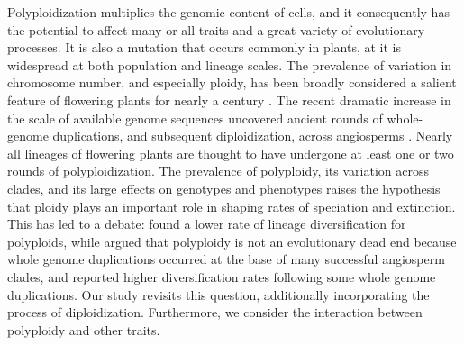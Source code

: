 Polyploidization multiplies the genomic content of cells, and it consequently has the potential to affect many or all traits and a great variety of evolutionary processes.
It is also a mutation that occurs commonly in plants, at it is widespread at both population and lineage scales.
The prevalence of variation in chromosome number, and especially ploidy, has been broadly considered a salient feature of flowering plants for nearly a century \citep{stebbins1938}. %
The recent dramatic increase in the scale of available genome sequences uncovered ancient rounds of whole-genome duplications, and subsequent diploidization, across angiosperms \citep{lynch2000, vision2000}. %
Nearly all lineages of flowering plants are thought to have undergone at least one or two rounds of polyploidization. %
%
The prevalence of polyploidy, its variation across clades, and its large effects on genotypes and phenotypes raises the hypothesis that ploidy plays an important role in shaping rates of speciation and extinction.
This has led to a debate: \citet{mayrose_2011, mayrose_2015} found a lower rate of lineage diversification for polyploids, while \citet{soltis_2014} argued that polyploidy is not an evolutionary dead end because whole genome duplications occurred at the base of many successful angiosperm clades, and \citet{landis_2018} reported higher diversification rates following some whole genome duplications. %
Our study revisits this question, additionally incorporating the process of diploidization.
Furthermore, we consider the interaction between polyploidy and other traits.

